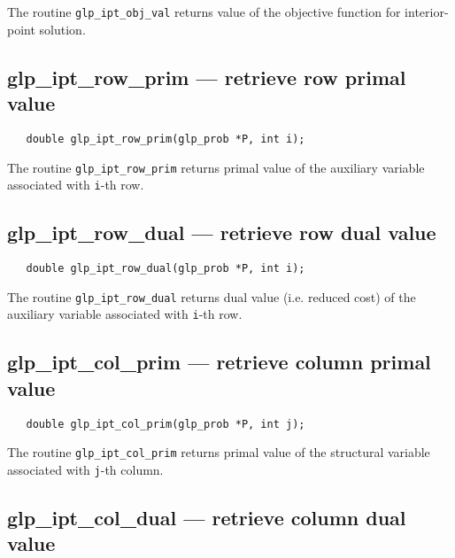 The routine \verb|glp_ipt_obj_val| returns value of the objective
function for interior-point solution.

\subsection{glp\_ipt\_row\_prim --- retrieve row primal value}

\synopsis

\begin{verbatim}
   double glp_ipt_row_prim(glp_prob *P, int i);
\end{verbatim}

\returns

The routine \verb|glp_ipt_row_prim| returns primal value of the
auxiliary variable associated with \verb|i|-th row.

\newpage

\subsection{glp\_ipt\_row\_dual --- retrieve row dual value}

\synopsis

\begin{verbatim}
   double glp_ipt_row_dual(glp_prob *P, int i);
\end{verbatim}

\returns

The routine \verb|glp_ipt_row_dual| returns dual value (i.e. reduced
cost) of the auxiliary variable associated with \verb|i|-th row.

\subsection{glp\_ipt\_col\_prim --- retrieve column primal value}

\synopsis

\begin{verbatim}
   double glp_ipt_col_prim(glp_prob *P, int j);
\end{verbatim}

\returns

The routine \verb|glp_ipt_col_prim| returns primal value of the
structural variable associated with \verb|j|-th column.

\subsection{glp\_ipt\_col\_dual --- retrieve column dual value}

